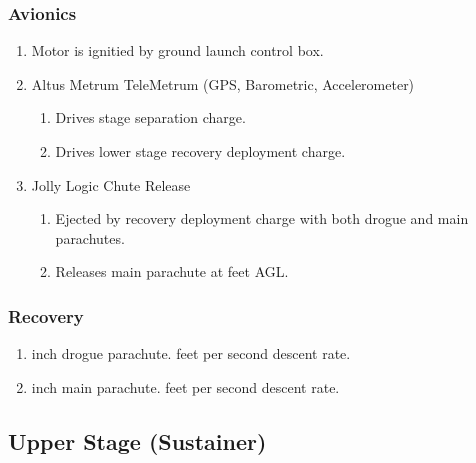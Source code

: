 \documentclass[12pt]{article}
\newcommand{\ph}{\framebox[48pt]{\rule{0pt}{12pt}}}
\begin{document}
\subsubsection{Avionics}
\begin{enumerate}[label=(\alph*)]
    \item Motor is ignitied by ground launch control box.
    \item Altus Metrum TeleMetrum (GPS, Barometric, Accelerometer)
    \begin{enumerate}[label=(\arabic*)]
        \item Drives stage separation charge.
        \item Drives lower stage recovery deployment charge.
    \end{enumerate}
    \item Jolly Logic Chute Release
    \begin{enumerate}[label=(\arabic*)]
        \item Ejected by recovery deployment charge with both drogue and main parachutes.
        \item Releases main parachute at \ph feet AGL.
    \end{enumerate}
\end{enumerate}
\subsubsection{Recovery}
\begin{enumerate}[label=(\alph*)]
    \item \ph inch drogue parachute. \ph feet per second descent rate.
    \item \ph inch main parachute. \ph feet per second descent rate.
\end{enumerate}
\subsection{Upper Stage (Sustainer)}
\end{document}
